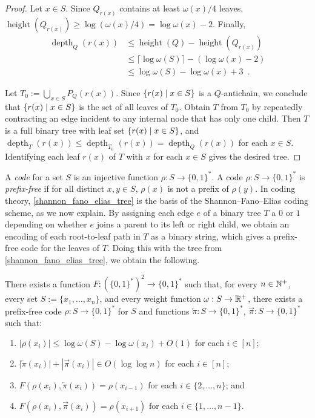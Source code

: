 \documentclass{patmorin}
\renewcommand{\le}{\leqslant}
\renewcommand{\geq}{\geqslant}
\newcommand{\defin}[1]{\emph{\textcolor{brightmaroon}{#1}}}
\DeclareMathOperator{\height}{height}
\DeclareMathOperator{\depth}{depth}
\newcommand{\Oh}{O}
\DeclarePairedDelimiter{\set}{\{}{\}}
\begin{document}
\begin{proof}
  Let $x\in S$. Since $Q_{r(x)}$ contains at least $\omega(x)/4$ leaves, $\height(Q_{r(x)}) \geq \log(\omega(x)/4) = \log\omega(x) - 2$. Finally,
  \begin{align*}
    \depth_Q(r(x))
     & \le \height(Q)-\height(Q_{r(x)})                    \\
     & \le \lceil\log\omega(S)\rceil - (\log\omega(x) - 2) \\
     & \le \log\omega(S) - \log\omega(x) +3 \enspace.
  \end{align*}

  Let $T_0:=\bigcup_{x\in S} P_Q(r(x))$.
  Since $\set{r(x) \mid x\in S}$ is a $Q$-antichain,
  we conclude that $\set{r(x)\mid x\in S}$ is the set of all leaves of $T_0$.
  Obtain $T$ from $T_0$ by repeatedly contracting an edge incident to any internal node that has only one child.
  Then $T$ is a full binary tree with leaf set $\set{r(x)\mid x\in S}$, and $\depth_T(r(x))\le\depth_{T_0}(r(x))=\depth_Q(r(x))$ for each $x\in S$.
  Identifying each leaf $r(x)$ of $T$ with $x$ for each $x\in S$ gives the desired tree.
\end{proof}

A \defin{code} for a set $S$ is an injective function $\rho:S\to\{0,1\}^*$. A code $\rho:S\to\{0,1\}^*$ is \defin{prefix-free} if for all distinct $x,y\in S$, $\rho(x)$ is not a prefix of $\rho(y)$.
In coding theory, \cref{shannon_fano_elias_tree} is the basis of the Shannon--Fano--Elias coding scheme, as we now explain.  By assigning each edge $e$ of a binary tree $T$ a $0$ or $1$ depending on whether $e$ joins a parent to its left or right child, we obtain an encoding of each root-to-leaf path in $T$ as a binary string, which gives a prefix-free code for the leaves of $T$. Doing this with the tree from \cref{shannon_fano_elias_tree}, we obtain the following.

\begin{cor}\label{shannon_fano_elias_code}
  There exists a function $F:(\{0,1\}^*)^2\to\{0,1\}^*$ such that, for every $n\in\mathbb{N}^+$, every set $S:=\{x_1,\ldots,x_n\}$, and every weight function $\omega:S\to\mathbb{R}^+$, there exists a prefix-free code $\rho:S\to \{0,1\}^*$ for $S$ and functions $\overleftarrow{\pi}:S\to\{0,1\}^*$, $\overrightarrow{\pi}:S\to\{0,1\}^*$ such that:
  \begin{enumerate}[nosep,nolistsep,label=\rm(\alph*)]
    \item\label{sfec_len} $|\rho(x_i)|\le \log\omega(S) - \log\omega(x_i)+\Oh(1)$ for each $i\in[n]$;
    \item\label{sfec_size} $|\overleftarrow{\pi}(x_i)|+|\overrightarrow{\pi}(x_i)|\in O(\log\log n)$ for each $i\in[n]$;
    \item\label{sfec_prev} $F(\rho(x_i),\overleftarrow{\pi}(x_i))=\rho(x_{i-1})$ for each $i\in\{2,\ldots,n\}$; and    
    \item\label{sfec_next} $F(\rho(x_i),\overrightarrow{\pi}(x_i))=\rho(x_{i+1})$ for each $i\in\{1,\ldots,n-1\}$.    
  \end{enumerate}
\end{cor}
\end{document}
